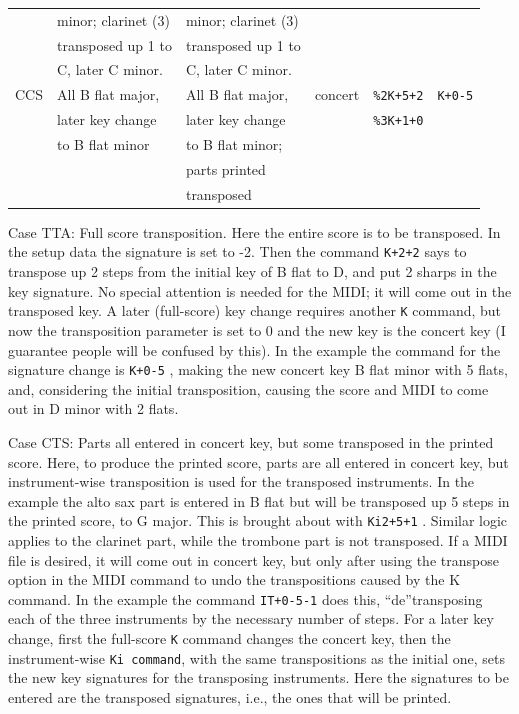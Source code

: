 \documentclass[11pt]{article}
\begin{document}
{\begin{center}
\begin{tabular}{cllcll}
     ~ & minor; clarinet (3)   & minor; clarinet (3) & ~       & ~           & ~           \\ 
     ~ & transposed up 1 to    & transposed up 1 to & ~       & ~           & ~           \\ 
     ~ & C, later C minor.     & C, later C minor. & ~       & ~           & ~           \\
    \hline
     CCS & All B flat major, & All B flat major, & concert & {\tt \%2K+5+2} & {\tt K+0-5} \\
     ~ & later key change      & later key change  & ~       & {\tt \%3K+1+0}     & ~           \\
     ~ & to B flat minor       & to B flat minor; & ~       & ~           & ~           \\ 
     ~ & ~                     & parts printed    & ~       & ~           & ~           \\ 
     ~ & ~                     & transposed        & ~       & ~           & ~           \\ 
    \hline
  \end{tabular}
\end{center}
\medskip
}

{\bfx Case TTA: Full score transposition.}
Here the entire score is to be transposed. In the setup data the signature is set to -2. Then
the command {\tt K+2+2} says to transpose up 2 steps from the initial key of B flat to D, and put 2
sharps in the key signature. No special attention is needed for the MIDI; it will come out in the
transposed key. A later (full-score) key change requires another {\tt K} command, but now the
transposition parameter is set to 0 and the new key is the concert key (I guarantee people will be
confused by this). In the example the command for the signature change is {\tt K+0-5} , making the
new concert key B flat minor with 5 flats, and, considering the initial transposition, causing the
score and MIDI to come out in D minor with 2 flats.

{\bfx Case CTS: Parts all entered in concert key, but some transposed in the printed score.}
Here, to produce the
printed score, parts are all entered in concert key, but instrument-wise transposition is used for
the transposed instruments. In the example the alto sax part is entered in B flat but will be
transposed up 5 steps in the printed score, to G major. This is brought about with {\tt Ki2+5+1} . Similar
logic applies to the clarinet part, while the trombone part is not transposed. If a MIDI file is
desired, it will come out in concert key, but only after using the transpose option in the MIDI
command to undo the transpositions caused by the K command. In the example the command
{\tt IT+0-5-1} does this, ``de''transposing each of the three instruments by the necessary number of
steps. For a later key change, first the full-score {\tt K} command changes the concert key, then the
instrument-wise {\tt Ki command}, with the same transpositions as the initial one, sets the new key
signatures for the transposing instruments. Here the signatures to be entered are the transposed
signatures, i.e., the ones that will be printed.
\end{document}
